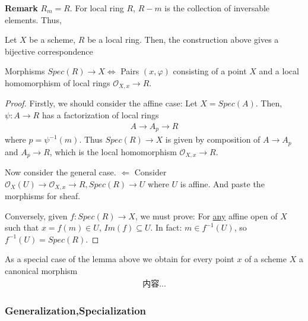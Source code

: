 \documentclass[Total.tex]{subfiles}
\begin{document}
			\textbf{Remark} $R_m=R$. For local ring $R$, $R-m$ is the collection of inversable elements. Thus,
			\begin{lemma}
				Let $X$ be a scheme, $R$ be a local ring. Then, the construction above gives a bijective correspondence
				\begin{center}
					Morphisms $Spec(R)\rightarrow X\Leftrightarrow$ Pairs $(x,\varphi)$ consisting of a point $X$ and a local homomorphism of local rings $\mathcal{O}_{X,x}\rightarrow R$. 
				\end{center}
			\end{lemma}
			\begin{proof}
				Firstly, we should consider the affine case: Let $X=Spec(A)$. Then, $\psi:A\rightarrow R$ has a factorization of local rings
				\begin{gather*}
					A\rightarrow A_p\rightarrow R
				\end{gather*}
				where $p=\psi^{-1}(m)$. Thus $Spec(R)\rightarrow X$ is given by composition of $A\rightarrow A_p$ and $A_p\rightarrow R$, which is the local homomorphism $\mathcal{O}_{X,x}\rightarrow R$.
				
				Now consider the general case. $\Leftarrow$ Consider $\mathcal{O}_X(U)\rightarrow \mathcal{O}_{X,x}\rightarrow R,Spec(R)\rightarrow U$ where $U$ is affine. And paste the morphisms for sheaf. 
				
				Conversely, given $f:Spec(R)\rightarrow X$, we must prove: For \underline{any} affine open of $X$ such that $x=f(m)\in U$, $Im(f)\subseteq U$. In fact: $m\in f^{-1}(U)$, so $f^{-1}(U)=Spec(R)$.
			\end{proof}
			As a special case of the lemma above we obtain for every point $x$ of a scheme $X$ a canonical morphism
			\begin{gather*}
				内容...
			\end{gather*}
			
			\begin{center}
			\end{center}
			\subsubsection{Generalization,Specialization}
			
\end{document}
